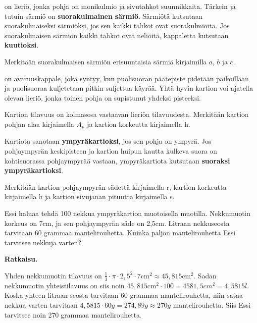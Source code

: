  on lieriö, jonka pohja on monikulmio ja sivutahkot suunnikkaita.
Tärkein ja tutuin särmiö on \textbf{suorakulmainen särmiö}.
Särmiötä kutsutaan suorakulmaiseksi särmiöksi, jos sen kaikki tahkot ovat suorakulmioita. Jos suorakulmaisen särmiön kaikki tahkot ovat neliöitä, kappaletta kutsutaan \textbf{kuutioksi}.

Merkitään suorakulmaisen särmiön erisuuntaisia särmiä kirjaimilla $a$, $b$ ja $c$. 



 on avaruuskappale, joka syntyy, kun puolisuoran päätepiste pidetään paikoillaan ja puolisuoraa kuljetetaan pitkin suljettua käyrää. Yhtä hyvin kartion voi ajatella olevan lieriö, jonka toinen pohja on supistunut yhdeksi pisteeksi.

Kartion tilavuus on kolmasosa vastaavan lieriön tilavuudesta. Merkitään kartion pohjan alaa kirjaimella $A_p$ ja kartion korkeutta kirjaimella h.


Kartiota sanotaan \textbf{ympyräkartioksi}, jos sen pohja on ympyrä. Jos pohjaympyrän keskipisteen ja kartion huipun kautta kulkeva suora on kohtisuorassa pohjaympyrää vastaan, ympyräkartiota kutsutaan \textbf{suoraksi ympyräkartioksi}.

Merkitään kartion pohjaympyrän sädettä kirjaimella r, kartion korkeutta kirjaimella h ja kartion sivujanan pituutta kirjaimella s.



\begin{esimerkki}
Essi haluaa tehdä 100 nekkua ympyräkartion muotoisella muotilla. Nekkumuotin korkeus on 7cm, ja sen pohjaympyrän säde on 2,5cm. Litraan nekkuseosta tarvitaan 60 grammaa mantelirouhetta. Kuinka paljon mantelirouhetta Essi tarvitsee nekkuja varten?

\textbf{Ratkaisu.}

Yhden nekkumuotin tilavuus on $\frac{1}{3} \cdot \pi \cdot 2,5^2 \cdot 7 \text{cm}^2 \approx 45,815\text{cm}^2.$ Sadan nekkumuotin yhteistilavuus on siis noin $45,815\text{cm}^2 \cdot 100 = 4581,5 {cm}^2=4,5815 l$. Koska yhteen litraan seosta tarvitaan 60 grammaa mantelirouhetta, niin sataa nekkua varten tarvitaan $4,5815 \cdot 60 g = 274,89g \approx 270 g$ mantelirouhetta. Siis Essi tarvitsee noin 270 grammaa mantelirouhetta.

\end{esimerkki}

